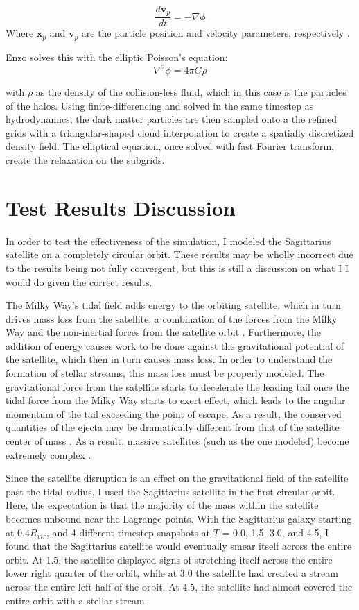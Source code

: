 \documentclass{article}
\begin{document}
\[
\frac{d \mathbf{v}_p}{dt} = -\nabla \phi
\]
Where $\mathbf{x}_p$ and $\mathbf{v}_p$ are the particle position and velocity parameters, respectively \cite{enzoAlgos}. 

Enzo solves this with the elliptic Poisson's equation:
\[
\nabla^2 \phi = 4\pi G \rho
\]

with $\rho$ as the density of the collision-less fluid, which in this case is the particles of the halos. Using finite-differencing and solved in the same timestep as hydrodynamics, the dark matter particles are then sampled onto a the refined grids with a triangular-shaped cloud interpolation to create a spatially discretized density field. The elliptical equation, once solved with fast Fourier transform, create the relaxation on the subgrids. 

\section{Test Results Discussion}
In order to test the effectiveness of the simulation, I modeled the Sagittarius satellite on a completely circular orbit.
These results may be wholly incorrect due to the results being not fully convergent, but this is still a discussion on what I I would do given the correct results.

The Milky Way's tidal field adds energy to the orbiting satellite, which in turn drives mass loss from the satellite, a combination of the forces from the Milky Way and the non-inertial forces from the satellite orbit \cite{structureofDarkMatterHalos}. Furthermore, the addition of energy causes work to be done against the gravitational potential of the satellite, which then in turn causes mass loss. In order to understand the formation of stellar streams, this mass loss must be properly modeled. The gravitational force from the satellite starts to decelerate the leading tail once the tidal force from the Milky Way starts to exert effect, which leads to the angular momentum of the tail exceeding the point of escape. As a result, the conserved quantities of the ejecta may be dramatically different from that of the satellite center of mass \cite{dymanicsOfTidalTails}. As a result, massive satellites (such as the one modeled) become extremely complex \cite{ibataLewis}.

Since the satellite disruption is an effect on the gravitational field of the satellite past the tidal radius, I used the Sagittarius satellite in the first circular orbit. Here, the expectation is that the majority of the mass within the satellite becomes unbound near the Lagrange points. With the Sagittarius galaxy starting at $0.4R_{vir}$, and 4 different timestep snapshots at $T$ = 0.0, 1.5, 3.0, and 4.5, I found that the Sagittarius satellite would eventually smear itself across the entire orbit. At 1.5, the satellite displayed signs of stretching itself across the entire lower right quarter of the orbit, while at 3.0 the satellite had created a stream across the entire left half of the orbit. At 4.5, the satellite had almost covered the entire orbit with a stellar stream. 

 
 
\end{document}
